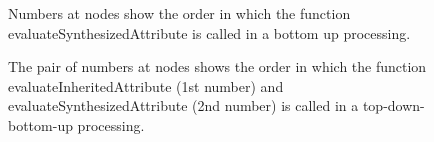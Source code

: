 \begin{figure}
\centerline{}
\caption{Numbers at nodes show the order in which the function evaluateSynthesizedAttribute is called in a bottom up processing.}
\label{AstProcessing:BottomUpAst}
\end{figure}

\begin{figure}
\centerline{}
\caption{The pair of numbers at nodes shows the order in which the function evaluateInheritedAttribute (1st number) and evaluateSynthesizedAttribute (2nd number) is called in a top-down-bottom-up processing.}
\label{AstProcessing:TopDownBottomUpAst}
\end{figure}

